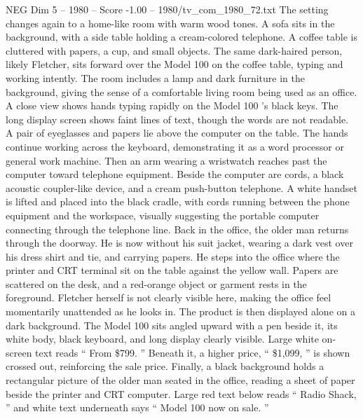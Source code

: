 \begin{textsample}{NEG Dim 5 – 1980 – Score -1.00 – 1980/tv\_com\_1980\_72.txt}
The setting changes again to a home-like room with warm wood tones.
A sofa sits in the background, with a side table holding a cream-colored telephone.
A coffee table is cluttered with papers, a cup, and small objects.
The same dark-haired person, likely Fletcher, sits forward over the Model 100 on the coffee table, typing and working intently.
The room includes a lamp and dark furniture in the background, giving the sense of a comfortable living room being used as an office.
A close view shows hands typing rapidly on the Model 100 ’s black keys.
The long display screen shows faint lines of text, though the words are not readable.
A pair of eyeglasses and papers lie above the computer on the table.
The hands continue working across the keyboard, demonstrating it as a word processor or general work machine.
Then an arm wearing a wristwatch reaches past the computer toward telephone equipment.
Beside the computer are cords, a black acoustic coupler-like device, and a cream push-button telephone.
A white handset is lifted and placed into the black cradle, with cords running between the phone equipment and the workspace, visually suggesting the portable computer connecting through the telephone line.
Back in the office, the older man returns through the doorway.
He is now without his suit jacket, wearing a dark vest over his dress shirt and tie, and carrying papers.
He steps into the office where the printer and CRT terminal sit on the table against the yellow wall.
Papers are scattered on the desk, and a red-orange object or garment rests in the foreground.
Fletcher herself is not clearly visible here, making the office feel momentarily unattended as he looks in.
The product is then displayed alone on a dark background.
The Model 100 sits angled upward with a pen beside it, its white body, black keyboard, and long display clearly visible.
Large white on-screen text reads “ From \$799. ” Beneath it, a higher price, “ \$1,099, ” is shown crossed out, reinforcing the sale price.
Finally, a black background holds a rectangular picture of the older man seated in the office, reading a sheet of paper beside the printer and CRT computer.
Large red text below reads “ Radio Shack, ” and white text underneath says “ Model 100 now on sale. ”

\end{textsample}
